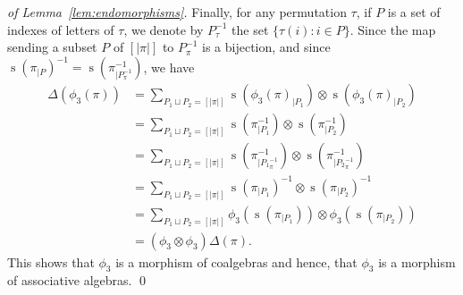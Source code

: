 \documentclass[a4paper]{llncs}
\DeclareMathOperator{\STD}{\mathrm{s}}
\begin{document}
\begin{proof}[of Lemma~\ref{lem:endomorphisms}]
    Finally, for any permutation $\tau$, if $P$ is a set of indexes of
    letters of $\tau$, we denote by $P_\tau^{-1}$ the set
    $\{\tau(i) : i \in P\}$. Since the map sending a subset $P$ of
    $[|\pi|]$ to $P_\pi^{-1}$ is a bijection, and since
    $\STD\left(\pi_{|P}\right)^{-1} = \STD\left(\pi^{-1}_{|P_\pi^{-1}}\right)$,
    we have
    \begin{equation} \begin{split}
        \Delta(\phi_3(\pi))
        & = \sum_{P_1 \sqcup P_2 = [|\pi|]}
        \STD\left(\phi_3(\pi)_{|P_1}\right)
        \otimes \STD\left(\phi_3(\pi)_{|P_2}\right) \\
        & = \sum_{P_1 \sqcup P_2 = [|\pi|]}
        \STD\left(\pi^{-1}_{|P_1}\right)
        \otimes \STD\left(\pi^{-1}_{|P_2}\right) \\
        & = \sum_{P_1 \sqcup P_2 = [|\pi|]}
        \STD\left(\pi^{-1}_{|{P_1}_\pi^{-1}}\right)
        \otimes \STD\left(\pi^{-1}_{|{P_2}_\pi^{-1}}\right) \\
        & = \sum_{P_1 \sqcup P_2 = [|\pi|]}
        \STD\left(\pi_{|P_1}\right)^{-1}
        \otimes \STD\left(\pi_{|P_2}\right)^{-1} \\
        & = \sum_{P_1 \sqcup P_2 = [|\pi|]}
        \phi_3\left(\STD\left(\pi_{|P_1}\right)\right)
        \otimes \phi_3\left(\STD\left(\pi_{|P_2}\right)\right) \\
        & = (\phi_3 \otimes \phi_3) \Delta(\pi).
    \end{split} \end{equation}
    This shows that $\phi_3$ is a morphism of coalgebras and hence, that
    $\phi_3$ is a morphism of associative algebras.
    \qed
\end{proof}
\bigskip
\end{document}
